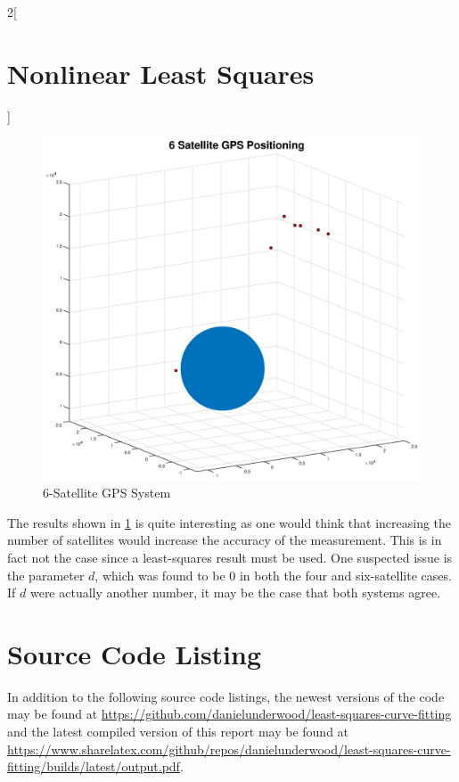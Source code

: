 \documentclass[10pt,a4paper]{article}
\begin{document}
\begin{multicols*}{2}[ \section*{Nonlinear Least Squares} ]
\begin{figure}[H]
\includegraphics[width=\columnwidth]{Figures/6satgps.eps}
\caption{6-Satellite GPS System}
\label{fig: 6satgps}
\end{figure}

The results shown in \cref{fig: 6satgps} is quite interesting as one would think that increasing the number of satellites would increase the accuracy of the measurement. This is in fact not the case since a least-squares result must be used. One suspected issue is the parameter $d$, which was found to be 0 in both the four and six-satellite cases. If $d$ were actually another number, it may be the case that both systems agree.
\end{multicols*}

\newpage

\section*{Source Code Listing}

In addition to the following source code listings, the newest versions of the code may be found at \url{https://github.com/danielunderwood/least-squares-curve-fitting} and the latest compiled version of this report may be found at \url{https://www.sharelatex.com/github/repos/danielunderwood/least-squares-curve-fitting/builds/latest/output.pdf}.




\end{document}
